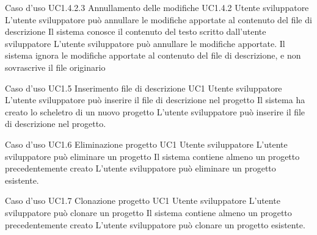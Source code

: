 \UCtitle
{Caso d'uso UC1.4.2.3}
{Annullamento delle modifiche}
\UC
{UC1.4.2}
{Utente sviluppatore}
{L'utente sviluppatore può annullare le modifiche apportate al contenuto del file di descrizione}
{Il sistema conosce il contenuto del testo scritto dall'utente sviluppatore}
\scenario
{L'utente sviluppatore può annullare le modifiche apportate.}
\post
{Il sistema ignora le modifiche apportate al contenuto del file di descrizione, e non sovrascrive il file originario}

\UCtitle
{Caso d'uso UC1.5}
{Inserimento file di descrizione}
\UC
{UC1}
{Utente sviluppatore}
{L'utente sviluppatore può inserire il file di descrizione nel progetto}
{Il sistema ha creato lo scheletro di un nuovo progetto}
\scenario
{L'utente sviluppatore può inserire il file di descrizione nel progetto.}

\UCtitle
{Caso d'uso UC1.6}
{Eliminazione progetto}
\UC
{UC1}
{Utente sviluppatore}
{L'utente sviluppatore può eliminare un progetto}
{Il sistema contiene almeno un progetto precedentemente creato}
\scenario
{L'utente sviluppatore può eliminare un progetto esistente.}

\UCtitle
{Caso d'uso UC1.7}
{Clonazione progetto}
\UC
{UC1}
{Utente sviluppatore}
{L'utente sviluppatore può clonare un progetto}
{Il sistema contiene almeno un progetto precedentemente creato}
\scenario
{L'utente sviluppatore può clonare un progetto esistente.}


